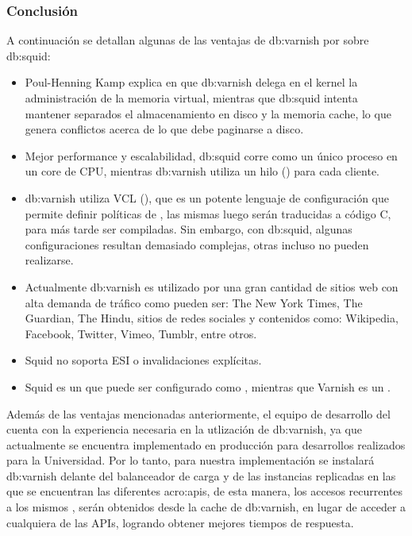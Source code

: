 \subsubsection{Conclusión}

A continuación se detallan algunas de las ventajas de \gls{db:varnish} por sobre \gls{db:squid}:

\begin{itemize}
  \item Poul-Henning Kamp explica en \cite{website:www.varnish-cache.org} que \gls{db:varnish} delega en el kernel la administración de la memoria virtual, mientras que \gls{db:squid} intenta mantener separados el almacenamiento en disco y la memoria cache, lo que genera conflictos acerca de lo que debe paginarse a disco.

  \item Mejor performance y escalabilidad, \gls{db:squid} corre como un único proceso en un core de CPU, mientras \gls{db:varnish} utiliza un hilo () para cada cliente.

  \item \gls{db:varnish} utiliza VCL (), que es un potente lenguaje de configuración que permite definir políticas de , las mismas luego serán traducidas a código C, para más tarde ser compiladas.  Sin embargo, con \gls{db:squid}, algunas configuraciones resultan demasiado complejas, otras incluso no pueden realizarse.

  \item Actualmente \gls{db:varnish} es utilizado por una gran cantidad de sitios web con alta demanda de tráfico como pueden ser: The New York Times, The Guardian, The Hindu, sitios de redes sociales y contenidos como: Wikipedia, Facebook, Twitter, Vimeo, Tumblr, entre otros.

  \item Squid no soporta ESI o invalidaciones explícitas.

  \item Squid es un  que puede ser configurado como , mientras que Varnish es un .
\end{itemize}

Además de las ventajas mencionadas anteriormente, el equipo de desarrollo del {\cespi} cuenta con la experiencia necesaria en la utlización de \gls{db:varnish}, ya que actualmente se encuentra implementado en producción para desarrollos realizados para la Universidad.  Por lo tanto, para nuestra implementación se instalará \gls{db:varnish} delante del balanceador de carga y de las instancias replicadas en las que se encuentran las diferentes \glspl{acro:api}, de esta manera, los accesos recurrentes a los mismos , serán obtenidos desde la cache de \gls{db:varnish}, en lugar de acceder a cualquiera de las APIs, logrando obtener mejores tiempos de respuesta.
